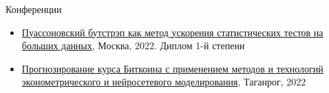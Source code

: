 \documentclass{resume}  %
\begin{document}

\begin{rSection}{Конференции}
   \begin{itemize}
      \itemsep -5pt {}
      \item \href{https://elibrary.ru/ipezcy}{Пуассоновский бутстрэп как метод ускорения статистических тестов на больших данных}, Москва, 2022. Диплом 1-й степени
      \item \href{https://os-russia.com/SBORNIKI/KON-449-NC.pdf}{Прогнозирование курса Биткоина с применением методов и технологий эконометрического и нейросетевого моделирования}, Таганрог, 2022
   \end{itemize}
\end{rSection}
\end{document}
